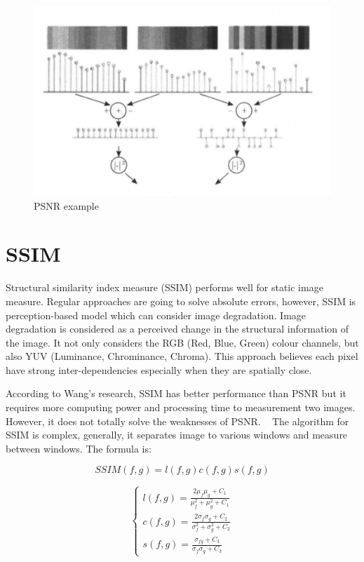 \begin{figure}[h]
\includegraphics[width=\columnwidth]{image/PSNR_example.png}
\caption{PSNR example \cite{Tong2006IamgeQuality}}
\label{fig:figure}
\end{figure} 


\section{\label{sec:level1}SSIM}

Structural similarity index measure (SSIM) performs well for static image measure. Regular approaches are going to solve absolute errors, however, SSIM is perception-based model which can consider image degradation. Image degradation is considered as a perceived change in the structural information of the image.  It not only considers the RGB (Red, Blue, Green) colour channels, but also YUV (Luminance, Chrominance, Chroma). This approach believes each pixel have strong inter-dependencies especially when they are spatially close.

According to Wang’s research, SSIM has better performance than PSNR but it requires more computing power and processing time to measurement two images. However, it does not totally solve the weaknesses of PSNR. ~\cite{wang2005structural} The algorithm for SSIM is complex, generally, it separates image to various windows and measure between windows. The formula is:

\begin{equation}
SSIM ( f ,g ) = l ( f ,g )c ( f ,g )s ( f ,g )
\end{equation}

\begin{equation}
\begin{cases} l(f,g) = \frac{2\mu_{f}\mu_{g} + C_{1}}{\mu^2_{f} + \mu^2_{g} + C_{1}}\\ 
c(f,g) = \frac{2\sigma_{f}\sigma_{g} + C_{2}}{\sigma^2_{f} + \sigma^2_{g} + C_{2}}\\
s(f,g) = \frac{\sigma_{fg} + C_{3}}{\sigma_{f}\sigma_{g} + C_{3}}
\end{cases}
\end{equation}



